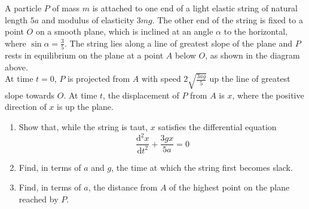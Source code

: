 \documentclass[leqno]{article}
\begin{document}
\begin{enumerate}[
  label=\textbf{\arabic*.},
  leftmargin=*,
  topsep=0pt,
  partopsep=0pt,
  parsep=0pt
]
\begin{figure}[H]
\end{figure}


A particle $P$ of mass $m$ is attached to one end of a light elastic string of natural length $5a$ and modulus of elasticity $3mg$. The other end of the string is fixed to a point $O$ on a smooth plane, which is inclined at an angle $\alpha$ to the horizontal, where $\sin\alpha=\frac{3}{5}$. The string lies along a line of greatest slope of the plane and $P$ rests in equilibrium on the plane at a point $A$ below $O$, as shown in the diagram above. \\
At time $t=0$, $P$ is projected from $A$ with speed $2\sqrt{\frac{3ag}{5}}$ up the line of greatest slope towards $O$. At time $t$, the displacement of $P$ from $A$ is $x$, where the positive direction of $x$ is up the plane. \\
\begin{enumerate}[label=\textbf{(\alph*)}]
\item Show that, while the string is taut, $x$ satisfies the differential equation
\[
\frac{\mathrm{d}^2x}{\mathrm{d}t^2}+\frac{3gx}{5a}=0
\] 
\item Find, in terms of $a$ and $g$, the time at which the string first becomes slack.  \\
\item Find, in terms of $a$, the distance from $A$ of the highest point on the plane reached by $P$.  \\
\end{enumerate}

\newpage

\questionitem

\begin{figure}[H]
    \centering
{}
\end{figure}
\end{enumerate}
\end{document}
